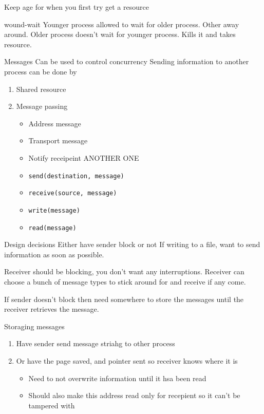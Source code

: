 \documentclass{article}
\begin{document}
			Keep age for when you first try get a resource

		wound-wait
			Younger process allowed to wait for older process.
			Other away around. Older process doesn't wait for younger process. Kills it and takes resource.

	Messages
		Can be used to control concurrency
		Sending information to another process can be done by
		\begin{enumerate}
			\item Shared resource
			\item Message passing
			\begin{itemize}
				\item Address message
				\item Transport message
				\item Notify receipeint
				ANOTHER ONE
				\item \texttt{send(destination, message)}
				\item \texttt{receive(source, message)}
				\item \texttt{write(message)}
				\item \texttt{read(message)}
			\end{itemize}
		\end{enumerate}

		Design decisions
			Either have sender block or not
			If writing to a file, want to send information as soon as possible.

			Receiver should be blocking, you don't want any interruptions.
			Receiver can choose a bunch of message types to stick around for and receive if any come.

			If sender doesn't block then need somewhere to store the messages until the receiver retrieves the message.

		Storaging messages
			\begin{enumerate}
				\item Have sender send message striahg to other process
				\item Or have the page saved, and pointer sent so receiver knows where it is
				\begin{itemize}
					\item Need to not overwrite information until it hsa been read
					\item Should also make this address read only for recepient so it can't be tampered with
				\end{itemize}
			\end{enumerate}
\end{document}
